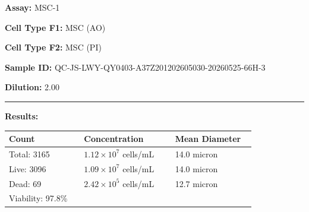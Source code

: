 \documentclass[UTF8,10pt,a4paper,fontset=fandol]{ctexart}
\newcommand{\fieldvalue}[1]{#1}
\begin{document}
\newpage

\noindent
\textbf{Assay:} %
\fieldvalue{MSC-1}

\noindent
\textbf{Cell Type F1:} %
\fieldvalue{MSC (AO)}

\noindent
\textbf{Cell Type F2:} %
\fieldvalue{MSC (PI)}

\medskip

\noindent
\textbf{Sample ID:} %
\fieldvalue{QC-JS-LWY-QY0403-A37Z201202605030-20260525-66H-3}

\noindent
\textbf{Dilution:} %
\fieldvalue{2.00}

\bigskip
\hrule
\medskip

\noindent
\textbf{Results:}

\medskip

\small
\begin{tabular}{@{}p{0.28\linewidth}p{0.34\linewidth}p{0.30\linewidth}@{}}
\textbf{Count} & \textbf{Concentration} & \textbf{Mean Diameter} \\[2pt]
\hline
Total:
\fieldvalue{3165}
&
\fieldvalue{$1.12 \times 10^{7}$ cells/mL}
&
\fieldvalue{14.0 micron}
\\[4pt]

Live:
\fieldvalue{3096}
&
\fieldvalue{$1.09 \times 10^{7}$ cells/mL}
&
\fieldvalue{14.0 micron}
\\[4pt]

Dead:
\fieldvalue{69}
&
\fieldvalue{$2.42 \times 10^{5}$ cells/mL}
&
\fieldvalue{12.7 micron}
\\[4pt]

Viability:
\fieldvalue{97.8\%}
&
&
\end{tabular}
\normalsize
\end{document}
